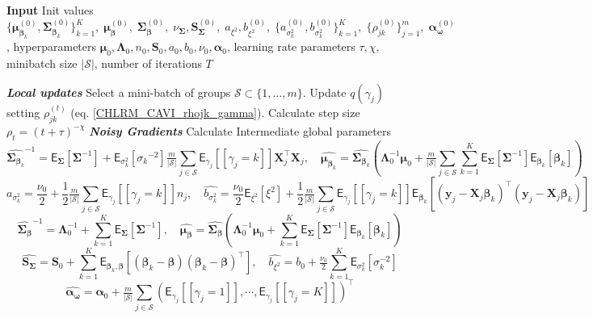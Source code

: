 \begin{algorithm}[H]
\scriptsize 
\caption{SVI for CHLRM}
\label{SVI_CHLRM_alg}
\begin{algorithmic}
\State \textbf{Input} Init values $
\{\bm{\mu}_{\bm{\beta}_k}^{(0)},\bm{\Sigma}_{\bm{\beta}_k}^{(0)}\}_{k=1}^K,\;
\bm{\mu}_{\bm{\beta}}^{(0)},\;\bm{\Sigma}_{\bm{\beta}}^{(0)},\;
\nu_{\bm{\Sigma}},\bm{S}_{\bm{\Sigma}}^{(0)},\;
a_{\xi^2}, b_{\xi^2}^{(0)},\;
\{a_{\sigma_k^2}^{(0)}, b_{\sigma_k^2}^{(0)}\}_{k=1}^K,\;
\{\rho_{jk}^{(0)}\}_{j=1}^m,\;
\bm{\alpha}^{(0)}_{\bm{\omega}}$, hyperparameters $\bm{\mu}_0,\bm{\Lambda}_0,n_0,\bm{S}_0,a_0,b_0,\nu_0,\bm{\alpha}_0$, learning rate parameters $\tau,\chi$, minibatch size $|\mathcal{S}|$, number of iterations $T$

\State \textbf{\textit{Local updates}}
  \State Select a mini-batch of groups $\mathcal{S} \subset \{1,\dots,m\}$.
    \State Update $q(\gamma_j)$ setting $\rho_{jk}^{(t)}$ (eq. \ref{CHLRM_CAVI_rhojk_gamma}).
  \EndFor
  \State  Calculate step size  $\rho_t = (t+\tau)^{-\chi}$
  \State \textbf{\textit{Noisy Gradients}}
  \State Calculate Intermediate global parameters
  $$
    \hat{\bm{\Sigma}_{\bm{\beta}_k}}^{-1} =  \mathsf{E}_{\bm{\Sigma}}\left[\bm{\Sigma}^{-1}\right]+\mathsf{E}_{\sigma^2_k}\left[{\sigma_k}^{-2}\right] \tfrac{m}{|\mathcal{S}|}\sum_{j \in \mathcal{S}} \mathsf{E}_{\gamma_j}\left[[\gamma_j=k]\right]\bm{X}_{j}^\top \bm{X}_{j}
  ,\quad
  \hat{\bm{\mu}_{\bm{\beta}_k}} =\hat{\bm{\Sigma}_{\bm{\beta}_k}}\left( \bm{\Lambda}_0^{-1} \bm{\mu}_0 +\tfrac{m}{|\mathcal{S}|}\sum_{j \in \mathcal{S}} \sum_{k=1}^K  \mathsf{E}_{\bm{\Sigma}}\left[\bm{\Sigma}^{-1}\right] \mathsf{E}_{\bm{\beta}_k}\!\left[\bm{\beta}_k \right]\right)
  $$
    $$
    \hat{a_{\sigma^2_k}} =  \frac{\nu_0}{2} + \frac{1}{2}\tfrac{m}{|\mathcal{S}|}\sum_{j \in \mathcal{S}}\mathsf{E}_{\gamma_j}\left[[\gamma_j=k]\right]n_j
  ,\quad
  \hat{b_{\sigma_k^2}} =\frac{ \nu_0 }{2}\mathsf{E}_{\xi^2}\left[\xi^2\right] +  \frac{1}{2}\tfrac{m}{|\mathcal{S}|}\sum_{j \in \mathcal{S}}\mathsf{E}_{\gamma_j}\left[[\gamma_j=k]\right]\mathsf{E}_{\bm{\beta}_k}\left[\left(\bm{y}_{j} - \bm{X}_{j} \bm{\beta}_k\right)^\top\left(\bm{y}_{j} - \bm{X}_{j} \bm{\beta}_k\right)\right]
  $$
    $$
    \hat{\bm{\Sigma}_{\bm{\beta}}}^{-1} = \bm{\Lambda}_0^{-1} + \sum_{k=1}^K 
  \mathsf{E}_{\bm{\Sigma}}\left[\bm{\Sigma}^{-1}\right]
  ,\quad
  \hat{\bm{\mu}_{\bm{\beta}}} =\hat{\bm{\Sigma}_{\bm{\beta}}}\left( \bm{\Lambda}_0^{-1} \bm{\mu}_0 +\sum_{k=1}^K  \mathsf{E}_{\bm{\Sigma}}\left[\bm{\Sigma}^{-1}\right] \mathsf{E}_{\bm{\beta}_k}\!\left[\bm{\beta}_k \right]\right)
  $$
  $$
  \hat{\bm{S}_{\bm{\Sigma}}} = \bm{S}_0+ \sum_{k=1}^K  \mathsf{E}_{\bm{\beta}_k,\bm{\beta}}\!\left[(\bm{\beta}_k-\bm{\beta})(\bm{\beta}_k-\bm{\beta})^\top\right],
  \quad 
  \hat{b_{\xi^2}} =b_0 + \tfrac{\nu_0}{2} \sum_{k=1}^K 
  \mathsf{E}_{\sigma_k^2}\left[\sigma_k^{-2}\right]
  $$
  $$
  \hat{\bm{\alpha}_{\bm{\omega}}} = \bm{\alpha}_0+\tfrac{m}{|\mathcal{S}|}\sum_{j \in \mathcal{S}}\left(\mathsf{E}_{\gamma_j}\left[[\gamma_j=1]\right],\cdots,\mathsf{E}_{\gamma_j}\left[[\gamma_j=K]\right]\right)^\top
  $$


\end{algorithmic}
\end{algorithm}

